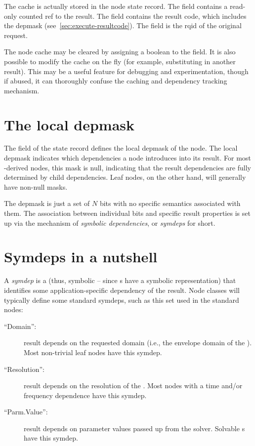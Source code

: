   The cache is actually stored in the node state record. The 
  field contains a read-only counted ref to the result. The
   field contains the result code, which includes the
  depmask (see~\ref{sec:execute-resultcode}). The  field is the rqid of
  the original request.

  The node cache may be cleared by assigning a boolean  to the
   field. It is also possible to modify the cache on the fly
  (for example, substituting in another result). This may be a useful feature
  for debugging and experimentation, though if abused, it can thoroughly
  confuse the caching and dependency tracking mechanism.  

\section{The local depmask}
\label{sec:depmask-node}
  
  The  field of the state record defines the local depmask of
  the node. The local depmask indicates which dependencies a node introduces
  into its result. For most -derived nodes, this mask is null,
  indicating that the result dependencies are fully determined by child
  dependencies. Leaf nodes, on the other hand, will generally have non-null
  masks.

  The depmask is just a set of $N$ bits with no specific semantics associated
  with them. The association between individual bits and specific result
  properties is set up via the mechanism of {\em symbolic dependencies}, or
  {\em symdeps} for short.

\section{Symdeps in a nutshell}
  \label{sec:symdeps}
  
  A {\em symdep} is a  (thus, symbolic -- since s have a
  symbolic representation) that identifies some application-specific dependency
  of the result. Node classes will typically define some standard symdeps, such
  as this set used in the standard nodes:

  \begin{description}
  
  \item[``Domain'':] result depends on the requested domain (i.e., the envelope
    domain of the \Cells). Most non-trivial leaf nodes have this symdep.

  \item[``Resolution'':] result depends on the resolution of the \Cells. Most
    nodes with a time and/or frequency dependence have this symdep.
   
  \item[``Parm.Value'':] result depends on parameter values passed up from the
    solver. Solvable \Parm{}s have this symdep.
  
  \end{description}
  
